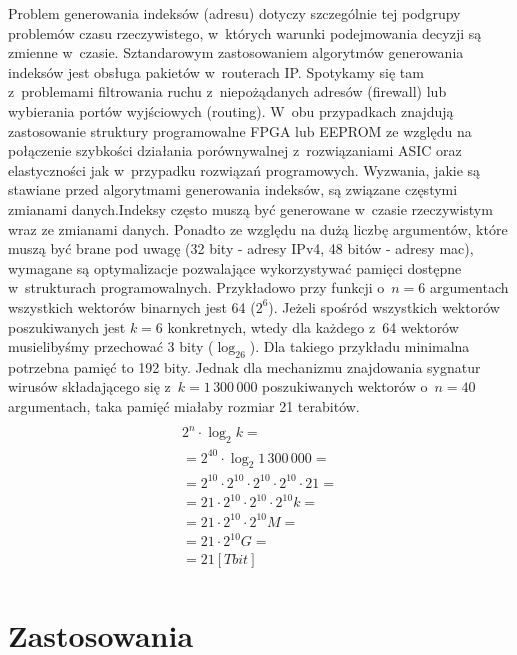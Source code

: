 Problem generowania indeksów (adresu) dotyczy szczególnie tej podgrupy problemów czasu rzeczywistego,
w~których warunki podejmowania decyzji są zmienne w~czasie.
Sztandarowym zastosowaniem algorytmów generowania indeksów jest obsługa pakietów w~routerach IP.
Spotykamy się tam z~problemami filtrowania ruchu z~niepożądanych adresów (firewall) lub wybierania portów wyjściowych (routing).
W~obu przypadkach znajdują zastosowanie struktury programowalne FPGA lub EEPROM
ze względu na połączenie szybkości działania porównywalnej z~rozwiązaniami ASIC oraz elastyczności jak w~przypadku rozwiązań programowych.
Wyzwania,
jakie są stawiane przed algorytmami generowania indeksów,
są związane częstymi zmianami danych.Indeksy często muszą być generowane w~czasie rzeczywistym wraz ze zmianami danych.
Ponadto ze względu na dużą liczbę argumentów,
które muszą być brane pod uwagę (32 bity - adresy IPv4, 48 bitów - adresy mac),
wymagane są optymalizacje pozwalające wykorzystywać pamięci dostępne w~strukturach programowalnych.
Przykładowo przy funkcji o~$n=6$ argumentach wszystkich wektorów binarnych jest 64 ($2^6$).
Jeżeli spośród wszystkich wektorów poszukiwanych jest $k=6$ konkretnych, wtedy dla każdego z~64 wektorów musielibyśmy przechować 3 bity ($\log_26$).
Dla takiego przykładu minimalna potrzebna pamięć to 192 bity.
Jednak dla mechanizmu znajdowania sygnatur wirusów składającego się z~$k=1\,300\,000$ poszukiwanych wektorów o~$n=40$ argumentach, taka pamięć miałaby rozmiar 21 terabitów.
\begin{multline} \\
2^n \cdot \log_2 k = \\
= 2^{40} \cdot \log_2 1\,300\,000 = \\
= 2^{10} \cdot 2^{10} \cdot 2^{10} \cdot 2^{10} \cdot 21 = \\
=21 \cdot 2^{10} \cdot 2^{10} \cdot 2^{10} k = \\
=21 \cdot 2^{10} \cdot 2^{10} M = \\
=21 \cdot 2^{10} G = \\
=21 [Tbit] \\
\end{multline}


\section{Zastosowania}



